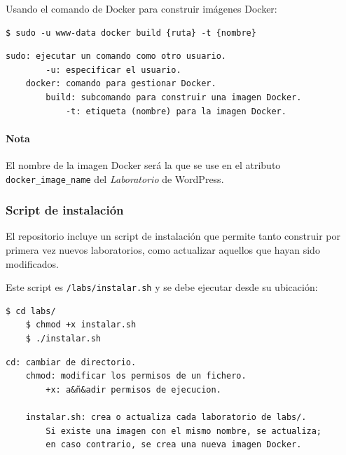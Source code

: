                 Usando el comando de Docker para construir imágenes Docker:
                \\

                \begin{lstlisting}[style=bash_style]
    $ sudo -u www-data docker build {ruta} -t {nombre}
                \end{lstlisting}

                \begin{lstlisting}[style=comment_style]
    sudo: ejecutar un comando como otro usuario.
        -u: especificar el usuario.
    docker: comando para gestionar Docker.
        build: subcomando para construir una imagen Docker.
            -t: etiqueta (nombre) para la imagen Docker.
                \end{lstlisting}

                \paragraph{Nota}

                    El nombre de la imagen Docker será la que se use en el atributo \texttt{docker\_image\_name} del \textit{Laboratorio} de WordPress.

            \subsubsection{Script de instalación}

                El repositorio incluye un script de instalación que permite tanto construir por primera vez nuevos laboratorios, como actualizar aquellos que hayan sido modificados.

                Este script es \texttt{/labs/instalar.sh} y se debe ejecutar desde su ubicación:
                \\

                \begin{lstlisting}[style=bash_style]
    $ cd labs/
    $ chmod +x instalar.sh
    $ ./instalar.sh
                \end{lstlisting}

                \begin{lstlisting}[style=comment_style]
    cd: cambiar de directorio.
    chmod: modificar los permisos de un fichero.
        +x: a&ñ&adir permisos de ejecucion.

    instalar.sh: crea o actualiza cada laboratorio de labs/.
        Si existe una imagen con el mismo nombre, se actualiza;
        en caso contrario, se crea una nueva imagen Docker.
                \end{lstlisting}

